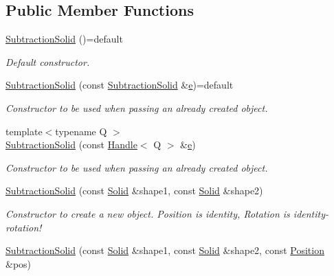\subsection*{Public Member Functions}
\begin{DoxyCompactItemize}
\item 
\hyperlink{class_d_d4hep_1_1_geometry_1_1_subtraction_solid_ac47559bc94cc05e908547ff2a603d3fd}{Subtraction\+Solid} ()=default
\begin{DoxyCompactList}\small\item\em Default constructor. \end{DoxyCompactList}\item 
\hyperlink{class_d_d4hep_1_1_geometry_1_1_subtraction_solid_a4e8e7e428d965229846f6cde8c65d7f7}{Subtraction\+Solid} (const \hyperlink{class_d_d4hep_1_1_geometry_1_1_subtraction_solid}{Subtraction\+Solid} \&\hyperlink{_volumes_8cpp_a8a9a1f93e9b09afccaec215310e64142}{e})=default
\begin{DoxyCompactList}\small\item\em Constructor to be used when passing an already created object. \end{DoxyCompactList}\item 
{\footnotesize template$<$typename Q $>$ }\\\hyperlink{class_d_d4hep_1_1_geometry_1_1_subtraction_solid_a7c8d104f3b5f1a6d921f6f1168149844}{Subtraction\+Solid} (const \hyperlink{class_d_d4hep_1_1_handle}{Handle}$<$ Q $>$ \&\hyperlink{_volumes_8cpp_a8a9a1f93e9b09afccaec215310e64142}{e})
\begin{DoxyCompactList}\small\item\em Constructor to be used when passing an already created object. \end{DoxyCompactList}\item 
\hyperlink{class_d_d4hep_1_1_geometry_1_1_subtraction_solid_a41ea60f70c3ad3d119510470610936ec}{Subtraction\+Solid} (const \hyperlink{namespace_d_d4hep_1_1_geometry_a83de90a8dcc7378ba47d54ef9a6a687b}{Solid} \&shape1, const \hyperlink{namespace_d_d4hep_1_1_geometry_a83de90a8dcc7378ba47d54ef9a6a687b}{Solid} \&shape2)
\begin{DoxyCompactList}\small\item\em Constructor to create a new object. Position is identity, Rotation is identity-\/rotation! \end{DoxyCompactList}\item 
\hyperlink{class_d_d4hep_1_1_geometry_1_1_subtraction_solid_a7db81162af38bc569247d94d06d7b3fd}{Subtraction\+Solid} (const \hyperlink{namespace_d_d4hep_1_1_geometry_a83de90a8dcc7378ba47d54ef9a6a687b}{Solid} \&shape1, const \hyperlink{namespace_d_d4hep_1_1_geometry_a83de90a8dcc7378ba47d54ef9a6a687b}{Solid} \&shape2, const \hyperlink{namespace_d_d4hep_1_1_geometry_a55083902099d03506c6db01b80404900}{Position} \&pos)

\end{DoxyCompactItemize}
